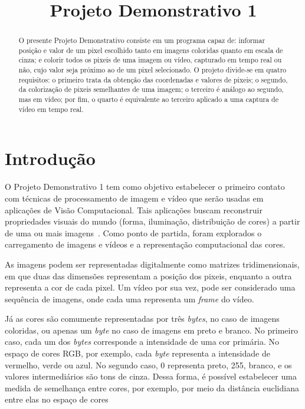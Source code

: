 \documentclass{bmvc2k}
\title{Projeto Demonstrativo 1}
\begin{document}
\begin{NoHyper}
\maketitle
\end{NoHyper}

\begin{abstract}
O presente Projeto Demonstrativo consiste em um programa capaz de: informar posição e valor de um pixel escolhido tanto em imagens coloridas quanto em escala de cinza; e colorir todos os pixeis de uma imagem ou vídeo, capturado em tempo real ou não, cujo valor seja próximo ao de um pixel selecionado. O projeto divide-se em quatro requisitos: o primeiro trata da obtenção das coordenadas e valores de pixeis; o segundo, da colorização de pixeis semelhantes de uma imagem; o terceiro é análogo ao segundo, mas em vídeo; por fim, o quarto é equivalente ao terceiro aplicado a uma captura de vídeo em tempo real.
\end{abstract}

\section{Introdução}
\label{sec:intro}
O Projeto Demonstrativo 1 tem como objetivo estabelecer o primeiro contato com técnicas de processamento de imagem e vídeo que serão usadas em aplicações de Visão Computacional. Tais aplicações buscam reconstruir propriedades visuais do mundo (forma, iluminação, distribuição de cores) a partir de uma ou mais imagens~\cite{Szeliski:2010:CVA:1941882}. Como ponto de partida, foram explorados o carregamento de imagens e vídeos e a representação computacional das cores.

As imagens podem ser representadas digitalmente como matrizes tridimensionais, em que duas das dimensões representam a posição dos pixeis, enquanto a outra representa a cor de cada pixel. Um vídeo por sua vez, pode ser considerado uma sequência de imagens, onde cada uma representa um \textit{frame} do vídeo.

Já as cores são comumente representadas por três \textit{bytes}, no caso de imagens coloridas, ou apenas um \textit{byte} no caso de imagens em preto e branco. No primeiro caso, cada um dos \textit{bytes} corresponde a intensidade de uma cor primária. No espaço de cores RGB, por exemplo, cada \textit{byte} representa a intensidade de vermelho, verde ou azul. No segundo caso, 0 representa preto, 255, branco, e os valores intermediários são tons de cinza. Dessa forma, é possível estabelecer uma medida de semelhança entre cores, por exemplo, por meio da distância euclidiana entre elas no espaço de cores
\end{document}
